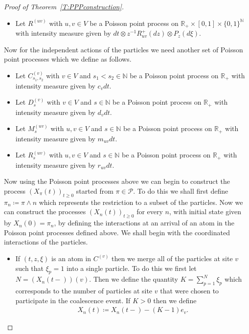 \documentclass[11pt]{article}
\theoremstyle{definition}
\newcommand{\R}{\mathbb{R}}
\newcommand{\N}{\mathbb{N}}
\newcommand{\thmref}[1]{Theorem~\ref{T:#1}}
\begin{document}
\begin{proof}[Proof of \thmref{PPPconstruction}]
\begin{itemize}
        \item Let $R^{(uv)}$ with $u,v \in V$ be a Poisson point process on $\R_+ \times [0,1] \times \{0,1\}^\N$ with intensity measure given by $dt \otimes z^{-1}R_{uv}^+(dz) \otimes P_z(d\xi)$.
    \end{itemize}
    
    \noindent Now for the independent actions of the particles we need another set of Poisson point processes which we define as follows.

    \begin{itemize}
        \item Let $C^{(v)}_{s_1,s_2}$ with $v \in V$ and $s_1<s_2 \in \N$ be a Poisson point process on $\R_+$ with intensity measure given by $c_vdt$.

        \item Let $D^{(v)}_s$ with $v \in V$ and $s \in \N$ be a Poisson point process on $\R_+$ with intensity measure given by $d_vdt$.

        \item Let $M^{(uv)}_s$  with $u,v \in V$ and $s \in \N$ be a Poisson point process on $\R_+$ with intensity measure given by $m_{uv}dt$.
        
        \item Let $R^{(uv)}_s$ with $u,v \in V$ and $s \in \N$ be a Poisson point process on $\R_+$ with intensity measure given by $r_{uv}dt$.
    \end{itemize}

    \noindent Now using the Poisson point processes above we can begin to construct the process $(X_\pi(t))_{t \geq 0}$ started from $\pi \in \mathcal{P}$. To do this we shall first define $\pi_n \coloneqq  \pi \wedge n $ which represents the restriction to a subset of the particles. Now we can construct the processes $(X_n(t))_{t\geq 0}$ for every $n$, with initial state given by $X_n(0) = \pi_n$, by defining the interactions at an arrival of an atom in the Poisson point processes defined above. We shall begin with the coordinated interactions of the particles.

    \begin{itemize}
        \item If $(t, z, \xi)$ is an atom in $C^{(v)}$ then we merge all of the particles at site $v$ such that $\xi_p = 1$ into a single particle. To do this we first let $N = (X_n(t-))(v)$. Then we define the quantity $K = \sum_{p = 1}^N \xi_p$ which corresponds to the number of particles at site $v$ that were chosen to participate in the coalescence event. If $K > 0$ then we define
        \begin{align*}
            X_n(t) \coloneqq X_n(t-) - (K - 1)e_v.
        \end{align*}


\end{itemize}
\end{proof}
\end{document}
